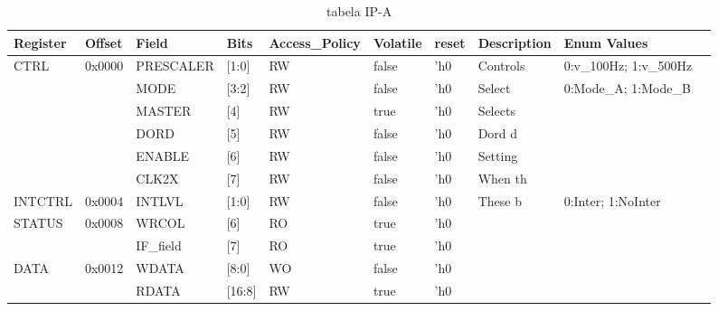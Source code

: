 \documentclass{article}
\begin{document}
\begin{table}[h]
\centering
\caption{tabela IP-A}
\label{table:IP-A}
\fontsize{7}{10}\selectfont %
\begin{tabular}{|l|l|l|l|l|l|l|l|l|l|}
\hline
\textbf{Register} & \textbf{Offset} & \textbf{Field} & \textbf{Bits} & \textbf{Access\_Policy} & \textbf{Volatile} & \textbf{reset} & \textbf{Description} & \textbf{Enum Values} \\ \hline
\multirow{6}{*}{CTRL} & \multirow{6}{*}{0x0000} & PRESCALER & [1:0]  & RW  & false & 'h0  & Controls & 0:v_100Hz; 1:v_500Hz       \\ \cline{3-9}
        &        & MODE      & [3:2]  & RW  & false & 'h0  & Select   & 0:Mode\_A; 1:Mode\_B   \\ \cline{3-9}
        &        & MASTER    & [4]    & RW  & true  & 'h0  & Selects  &                        \\ \cline{3-9}
        &        & DORD      & [5]    & RW  & false & 'h0  & Dord d   &                        \\ \cline{3-9}
        &        & ENABLE    & [6]    & RW  & false & 'h0  & Setting  &                        \\ \cline{3-9}  
        &        & CLK2X     & [7]    & RW  & false & 'h0  & When th  &                        \\ \hline  
INTCTRL & 0x0004 & INTLVL    & [1:0]  & RW  & false & 'h0  & These b  & 0:Inter; 1:NoInter     \\ \hline
\multirow{2}{*}{STATUS} & \multirow{2}{*}{0x0008} & WRCOL     & [6]    & RO  & true  & 'h0  &          &                        \\ \cline{3-9}
        &        & IF_field        & [7]    & RO  & true  & 'h0  &          &                        \\ \hline
\multirow{2}{*}{DATA} & \multirow{2}{*}{0x0012} & WDATA     & [8:0]  & WO  & false & 'h0  &          &                        \\ \cline{3-9}
        &        & RDATA     & [16:8] & RW  & true  & 'h0  &          &                        \\ \hline
\end{tabular}
\end{table}
\end{document}
